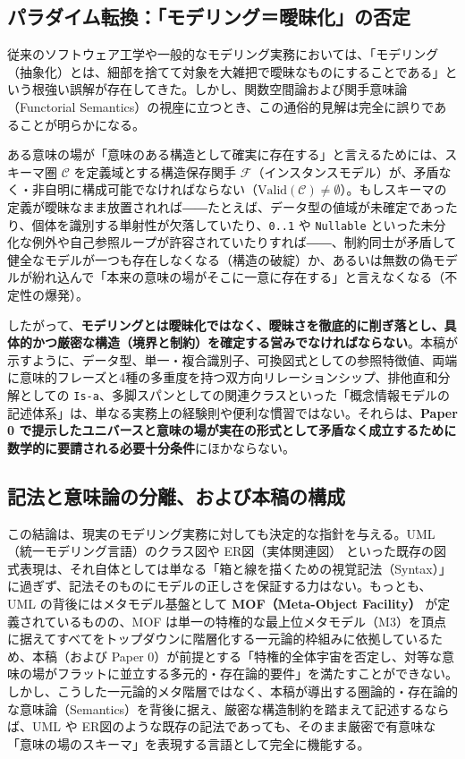 \documentclass[11pt,a4paper]{ltjsarticle}
\theoremstyle{definition}
\theoremstyle{plain}
\theoremstyle{remark}
\newcommand{\Valid}{\mathrm{Valid}}
\begin{document}
\subsection{パラダイム転換：「モデリング＝曖昧化」の否定}
従来のソフトウェア工学や一般的なモデリング実務においては、「モデリング（抽象化）とは、細部を捨てて対象を大雑把で曖昧なものにすることである」という根強い誤解が存在してきた。しかし、関数空間論および関手意味論（Functorial Semantics）の視座に立つとき、この通俗的見解は完全に誤りであることが明らかになる。

ある意味の場が「意味のある構造として確実に存在する」と言えるためには、スキーマ圏 $\mathcal{C}$ を定義域とする構造保存関手 $\mathcal{F}$（インスタンスモデル）が、矛盾なく・非自明に構成可能でなければならない（$\Valid(\mathcal{C}) \neq \emptyset$）。もしスキーマの定義が曖昧なまま放置されれば――たとえば、データ型の値域が未確定であったり、個体を識別する単射性が欠落していたり、\texttt{0..1} や \texttt{Nullable} といった未分化な例外や自己参照ループが許容されていたりすれば――、制約同士が矛盾して健全なモデルが一つも存在しなくなる（構造の破綻）か、あるいは無数の偽モデルが紛れ込んで「本来の意味の場がそこに一意に存在する」と言えなくなる（不定性の爆発）。

したがって、\textbf{モデリングとは曖昧化ではなく、曖昧さを徹底的に削ぎ落とし、具体的かつ厳密な構造（境界と制約）を確定する営みでなければならない}。本稿が示すように、データ型、単一・複合識別子、可換図式としての参照特徴値、両端に意味的フレーズと4種の多重度を持つ双方向リレーションシップ、排他直和分解としての \texttt{Is-a}、多脚スパンとしての関連クラスといった「概念情報モデルの記述体系」は、単なる実務上の経験則や便利な慣習ではない。それらは、\textbf{Paper 0 で提示したユニバースと意味の場が実在の形式として矛盾なく成立するために数学的に要請される必要十分条件}にほかならない。

\subsection{記法と意味論の分離、および本稿の構成}
この結論は、現実のモデリング実務に対しても決定的な指針を与える。UML（統一モデリング言語）のクラス図や ER図（実体関連図）\cite{chen1976} といった既存の図式表現は、それ自体としては単なる「箱と線を描くための視覚記法（Syntax）」に過ぎず、記法そのものにモデルの正しさを保証する力はない。もっとも、UML の背後にはメタモデル基盤として \textbf{MOF（Meta-Object Facility）}\cite{omg2019mof} が定義されているものの、MOF は単一の特権的な最上位メタモデル（M3）を頂点に据えてすべてをトップダウンに階層化する一元論的枠組みに依拠しているため、本稿（および Paper 0）が前提とする「特権的全体宇宙を否定し、対等な意味の場がフラットに並立する多元的・存在論的要件」を満たすことができない。しかし、こうした一元論的メタ階層ではなく、本稿が導出する圏論的・存在論的な意味論（Semantics）を背後に据え、厳密な構造制約を踏まえて記述するならば、UML や ER図のような既存の記法であっても、そのまま厳密で有意味な「意味の場のスキーマ」を表現する言語として完全に機能する。
\end{document}
